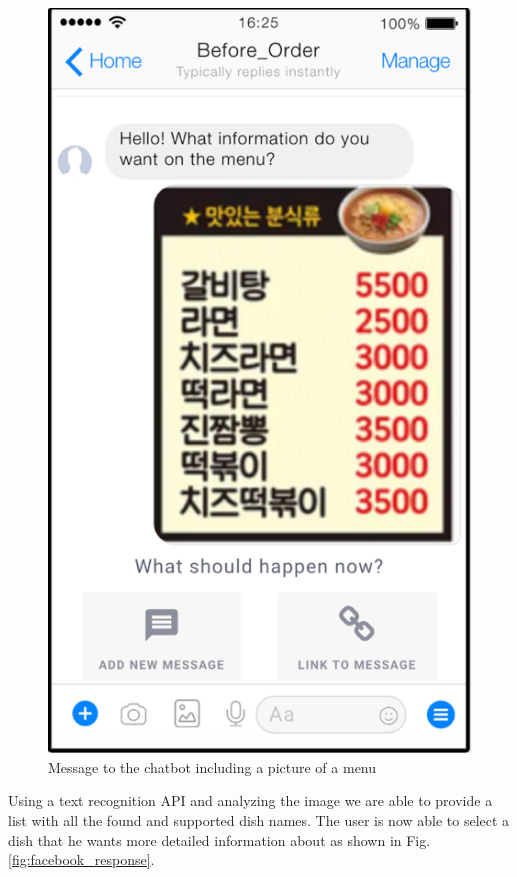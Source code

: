 \begin{figure}[htbp]
\centerline{\includegraphics[height=\custompicheight]{./pictures/facebook_menu}}
\caption{Message to the chatbot including a picture of a menu}
\label{fig:facebook_menu}
\end{figure}
\FloatBarrier

Using a text recognition API and analyzing the image we are able to provide a list with all the found and supported dish names. The user is now able to select a dish that he wants more detailed information about as shown in Fig. \ref{fig:facebook_response}.


